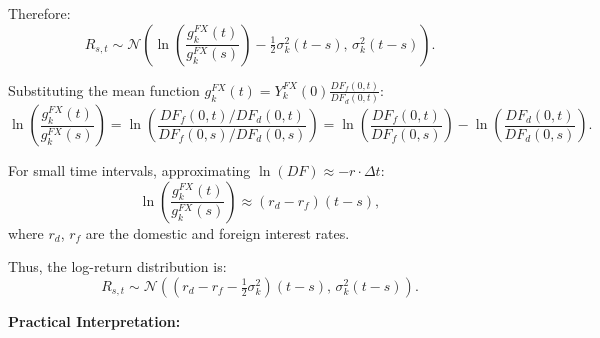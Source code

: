 Therefore:
\begin{equation}
	R_{s,t} \sim \mathcal{N}\!\left(\ln\!\left(\frac{g_k^{FX}(t)}{g_k^{FX}(s)}\right) - \tfrac{1}{2}\sigma_k^2(t-s), \, \sigma_k^2(t-s)\right).
\end{equation}

Substituting the mean function $g_k^{FX}(t) = Y_k^{FX}(0) \frac{DF_f(0,t)}{DF_d(0,t)}$:
\begin{equation}
	\ln\!\left(\frac{g_k^{FX}(t)}{g_k^{FX}(s)}\right) = \ln\!\left(\frac{DF_f(0,t)/DF_d(0,t)}{DF_f(0,s)/DF_d(0,s)}\right) = \ln\!\left(\frac{DF_f(0,t)}{DF_f(0,s)}\right) - \ln\!\left(\frac{DF_d(0,t)}{DF_d(0,s)}\right).
\end{equation}

For small time intervals, approximating $\ln(DF) \approx -r \cdot \Delta t$:
\begin{equation}
	\ln\!\left(\frac{g_k^{FX}(t)}{g_k^{FX}(s)}\right) \approx (r_d - r_f)(t-s),
\end{equation}
where $r_d$, $r_f$ are the domestic and foreign interest rates.

Thus, the log-return distribution is:
\begin{equation}
	R_{s,t} \sim \mathcal{N}\!\left((r_d - r_f - \tfrac{1}{2}\sigma_k^2)(t-s), \, \sigma_k^2(t-s)\right).
\end{equation}

\textbf{Practical Interpretation:}

